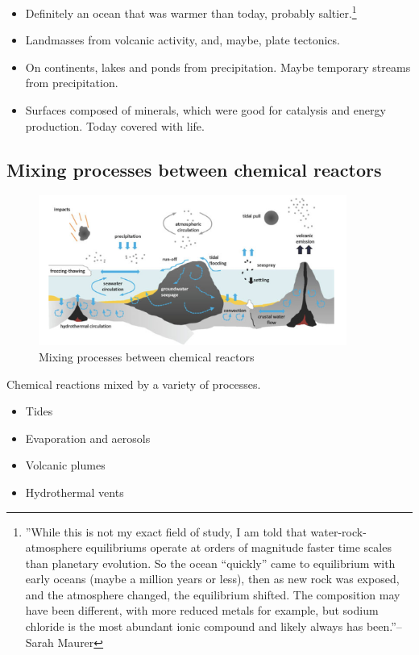\documentclass[]{article}
\begin{document}
  
  \begin{itemize}
  	\item  Definitely an ocean that was warmer than today, probably saltier.\footnote{''While this is not my exact field of study, I am told that water-rock-atmosphere equilibriums operate at orders of magnitude faster time scales than planetary evolution. So the ocean “quickly” came to equilibrium with early oceans (maybe a million years or less), then as new rock was exposed, and the atmosphere changed, the equilibrium shifted. The composition may have been different, with more reduced metals for example, but sodium chloride is the most abundant ionic compound and likely always has been.''--Sarah Maurer}\cite{knauth1998salinity} 
  	\item Landmasses from volcanic activity, and, maybe, plate tectonics.
  	\item On continents, lakes and ponds from precipitation.  Maybe temporary streams from precipitation.
  	\item Surfaces composed of minerals, which were good for catalysis and energy production. Today covered with life.
  \end{itemize}


\subsection{Mixing processes between chemical reactors}
\begin{figure}[h!]
	\caption{Mixing processes between chemical reactors \cite{stueken2013did}}
	\includegraphics[width=0.9\textwidth]{MixingProcesses}
\end{figure}
Chemical reactions mixed by a variety of processes.

\begin{itemize}
	\item Tides
	\item Evaporation and aerosols
	\item Volcanic plumes
	\item Hydrothermal vents
\end{itemize}
  
\end{document}
